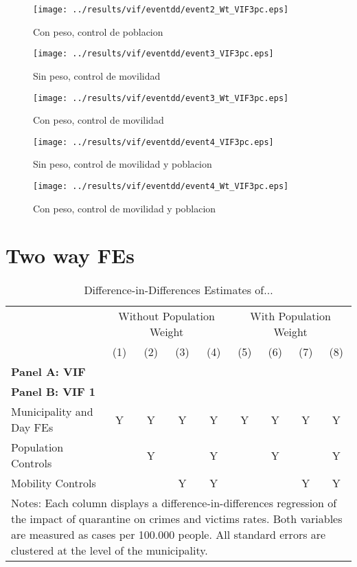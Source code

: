 \documentclass[11pt,letterpaper]{article}
\begin{document}
\begin{figure}[H]
\caption{Con peso, control de poblacion}
\centering
\texttt{[image: ../results/vif/eventdd/event2\_Wt\_VIF3pc.eps]}
\end{figure}
\begin{figure}[H]
\caption{Sin peso, control de movilidad}
\centering
\texttt{[image: ../results/vif/eventdd/event3\_VIF3pc.eps]}
\end{figure}

\begin{figure}[H]
\caption{Con peso, control de movilidad}
\centering
\texttt{[image: ../results/vif/eventdd/event3\_Wt\_VIF3pc.eps]}
\end{figure}
\begin{figure}[H]
\caption{Sin peso, control de movilidad y poblacion}
\centering
\texttt{[image: ../results/vif/eventdd/event4\_VIF3pc.eps]}
\end{figure}

\begin{figure}[H]
\caption{Con peso, control de movilidad y poblacion}
\centering
\texttt{[image: ../results/vif/eventdd/event4\_Wt\_VIF3pc.eps]}
\end{figure}

\section{Two way FEs}

\begin{landscape}
  \begin{table}
    \centering
    \caption{Difference-in-Differences Estimates of...} \label{tab:DD}
    \begin{tabular}{lcccccccc} \toprule
      &\multicolumn{4}{c}{Without Population Weight}&\multicolumn{4}{c}{With Population Weight} \\ 
      \cmidrule(r){2-5}\cmidrule(r){6-9}
      &(1)&(2)&(3)&(4)&(5)&(6)&(7)&(8) \\ \midrule
      \multicolumn{9}{l}{\textbf{Panel A: VIF}} \\
       
      \midrule
      \multicolumn{9}{l}{\textbf{Panel B: VIF 1}} \\
      
      \midrule
      Municipality and Day FEs &Y&Y&Y&Y&Y&Y&Y&Y \\
      Population Controls      & &Y& &Y& &Y& &Y \\
      Mobility Controls        & & &Y&Y& & &Y&Y \\
      \bottomrule
      \multicolumn{9}{p{21.8cm}}{{\footnotesize Notes: Each column displays a difference-in-differences regression of the impact of quarantine on crimes and victims rates. Both variables are measured as cases per 100.000 people.  All standard errors are clustered at the level of the municipality.}}
    \end{tabular}
  \end{table}
\end{landscape}
\end{document}
